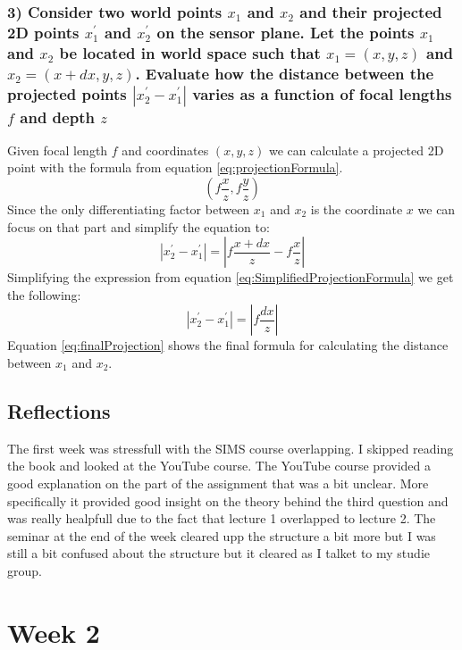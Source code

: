 \documentclass{article}
\begin{document}
    \subsubsection*{3)  Consider two world points $x_1$ and $x_2$ and their projected 2D points $x_1^\prime$ and $x_2^\prime$ on the sensor plane. Let the points $x_1$ and $x_2$ be located in world space such that $x_1=(x, y, z)$ and $x_2=(x+dx, y, z)$. Evaluate how the distance between the projected points  $|x_2^\prime - x_1^\prime|$ varies as a function of focal lengths $f$ and depth $z$}
    Given focal length $f$ and coordinates $(x, y, z)$ we can calculate a projected 2D point with the formula from equation \ref{eq:projectionFormula}.
    \begin{equation}
        \label{eq:projectionFormula}
        \left( f\frac{x}{z}, f\frac{y}{z} \right)
    \end{equation}
    Since the only differentiating factor between $x_1$ and $x_2$ is the coordinate $x$ we can focus on that part and simplify the equation to:
    \begin{equation}
        \label{eq:SimplifiedProjectionFormula}
        |x_2^\prime - x_1^\prime| = \left| f\frac{x+dx}{z} - f\frac{x}{z} \right|
    \end{equation}
    Simplifying the expression from equation \ref{eq:SimplifiedProjectionFormula} we get the following:
    \begin{equation}
        \label{eq:finalProjection}
        |x_2^\prime - x_1^\prime| = \left| f\frac{dx}{z} \right|
    \end{equation}
    Equation \ref{eq:finalProjection} shows the final formula for calculating the distance between $x_1$ and $x_2$.
    \subsection{Reflections}
    The first week was stressfull with the SIMS course overlapping. I skipped reading the book and looked at the YouTube course.
    The YouTube course provided a good explanation on the part of the assignment that was a bit unclear. More specifically
    it provided good insight on the theory behind the third question and was really healpfull due to the fact that lecture 1 overlapped to lecture 2.
    The seminar at the end of the week cleared upp the structure a bit more but I was still a bit confused about the structure but it cleared as I talket
    to my studie group.
    \section{Week 2}
\end{document}
